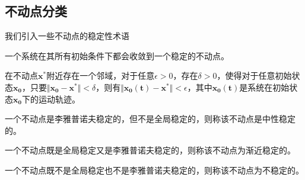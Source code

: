\subsection{不动点分类}
我们引入一些不动点的稳定性术语
\begin{defn}
    一个系统在其所有初始条件下都会收敛到一个稳定的不动点。 
\end{defn}
\begin{defn}
    在不动点$\mathbf{x^*}$附近存在一个邻域，对于任意$\epsilon>0$，存在$\delta>0$，使得对于任意初始状态$\mathbf{x_0}$，只要$\Vert \mathbf{x_0}-\mathbf{x^*}\Vert<\delta$，则有$\Vert \mathbf{x_0(t)}-\mathbf{x^*}\Vert<\epsilon$，其中$\mathbf{x_0(t)}$是系统在初始状态$\mathbf{x_0}$下的运动轨迹。
\end{defn}
\begin{defn}
    一个不动点是李雅普诺夫稳定的，但不是全局稳定的，则称该不动点是中性稳定的。
\end{defn}
\begin{defn}
    一个不动点既是全局稳定又是李雅普诺夫稳定的，则称该不动点为渐近稳定的。
\end{defn}
\begin{defn}
    一个不动点既不是全局稳定也不是李雅普诺夫稳定的，则称该不动点为不稳定的。
\end{defn}

